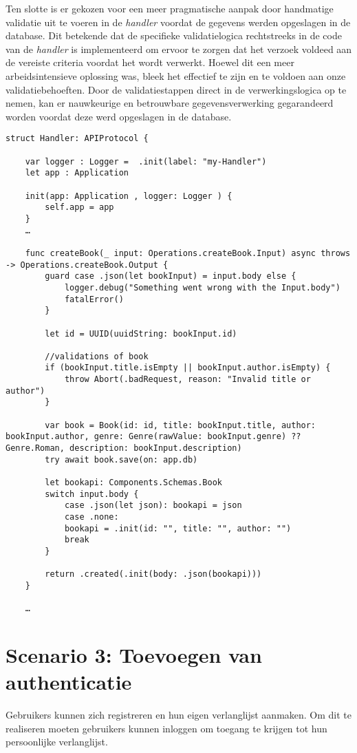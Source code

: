 Ten slotte is er  gekozen voor een meer pragmatische aanpak door handmatige validatie uit te voeren in de \textit{handler} voordat de gegevens werden opgeslagen in de database. Dit betekende dat de specifieke validatielogica rechtstreeks in de code van de \textit{handler} is implementeerd om ervoor te zorgen dat het verzoek voldeed aan de vereiste criteria voordat het wordt verwerkt. Hoewel dit een meer arbeidsintensieve oplossing was, bleek het effectief te zijn en te voldoen aan onze validatiebehoeften. Door de validatiestappen direct in de verwerkingslogica op te nemen, kan er nauwkeurige en betrouwbare gegevensverwerking gegarandeerd worden voordat deze werd opgeslagen in de database.

\begin{lstlisting}[caption=handler file]
struct Handler: APIProtocol {
    
    var logger : Logger =  .init(label: "my-Handler")
    let app : Application
    
    init(app: Application , logger: Logger ) {
        self.app = app
    }
    …
    
    func createBook(_ input: Operations.createBook.Input) async throws -> Operations.createBook.Output {
        guard case .json(let bookInput) = input.body else {
            logger.debug("Something went wrong with the Input.body")
            fatalError()
        }
        
        let id = UUID(uuidString: bookInput.id)
        
        //validations of book
        if (bookInput.title.isEmpty || bookInput.author.isEmpty) {
            throw Abort(.badRequest, reason: "Invalid title or author")
        }
        
        var book = Book(id: id, title: bookInput.title, author: bookInput.author, genre: Genre(rawValue: bookInput.genre) ?? Genre.Roman, description: bookInput.description)
        try await book.save(on: app.db)
        
        let bookapi: Components.Schemas.Book
        switch input.body {
            case .json(let json): bookapi = json
            case .none:
            bookapi = .init(id: "", title: "", author: "")
            break
        }
        
        return .created(.init(body: .json(bookapi)))
    }
    
    …

\end{lstlisting}
 \newpage

\section{Scenario 3: Toevoegen van authenticatie}
Gebruikers kunnen zich registreren en hun eigen verlanglijst aanmaken. Om dit te realiseren moeten gebruikers kunnen inloggen om toegang te krijgen tot hun persoonlijke verlanglijst. 

